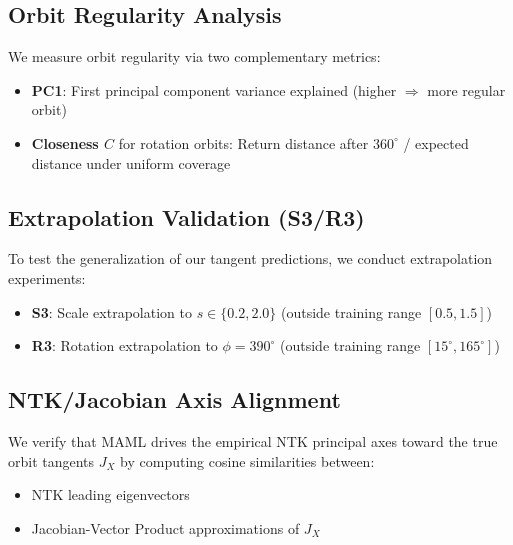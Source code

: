 \subsection{Orbit Regularity Analysis}

We measure orbit regularity via two complementary metrics:
\begin{itemize}
    \item \textbf{PC1}: First principal component variance explained (higher $\Rightarrow$ more regular orbit)
    \item \textbf{Closeness $C$} for rotation orbits: Return distance after $360^\circ$ / expected distance under uniform coverage
\end{itemize}




\subsection{Extrapolation Validation (S3/R3)}
\label{sec:extrapolation}

To test the generalization of our tangent predictions, we conduct extrapolation experiments:
\begin{itemize}
    \item \textbf{S3}: Scale extrapolation to $s \in \{0.2, 2.0\}$ (outside training range $[0.5, 1.5]$)
    \item \textbf{R3}: Rotation extrapolation to $\phi = 390^\circ$ (outside training range $[15^\circ, 165^\circ]$)
\end{itemize}



\subsection{NTK/Jacobian Axis Alignment}
\label{sec:ntk_alignment}

We verify that MAML drives the empirical NTK principal axes toward the true orbit tangents $J_X$ by computing cosine similarities between:
\begin{itemize}
    \item NTK leading eigenvectors
    \item Jacobian-Vector Product approximations of $J_X$
\end{itemize}




